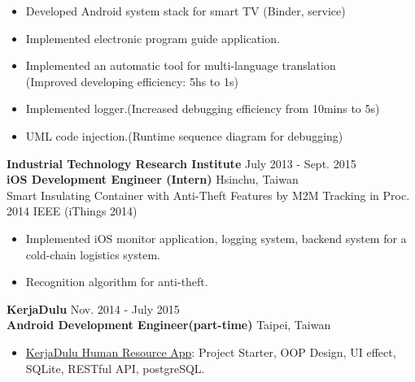 \documentclass{res}
\begin{document}
\begin{resume}
				\begin{itemize}[leftmargin=*]
					\item Developed Android system stack for smart TV (Binder, service)	
					\vspace{-0.05in}
					\item Implemented electronic program guide application.
					\vspace{-0.05in}
					\item Implemented an automatic tool for multi-language translation \\(Improved developing efficiency: 5hs to 1s)
					\vspace{-0.05in}		
					\item Implemented logger.(Increased debugging efficiency from 10mins to 5s)
					\vspace{-0.05in}	
					\item UML code injection.(Runtime sequence diagram for debugging)
				\end{itemize}
				\vspace{-0.12in}
				{\bf Industrial Technology Research Institute } {\hfill July 2013 - Sept. 2015}\\	
				{\bf iOS Development Engineer (Intern)}                        {\hfill Hsinchu, Taiwan}\\
				Smart Insulating Container with Anti-Theft Features by M2M Tracking {\footnotesize in Proc. 2014 IEEE (iThings 2014)}
				\vspace{0.05in}
				\begin{itemize}[leftmargin=*]


					\item Implemented iOS monitor application, logging system, backend system for a cold-chain logistics system.
					\vspace{-0.05in} 
					\item Recognition algorithm for anti-theft.
				\end{itemize}
				\vspace{-0.12in}

	 			{\bf KerjaDulu }                                {\hfill  Nov. 2014 - July 2015}\\
				{\bf Android Development Engineer(part-time)}			    	 {\hfill Taipei, Taiwan}
		
				\begin{itemize}[leftmargin=*]
					\item {\href{https://play.google.com/store/apps/details?id=com.kerjadulu.kerjadulu&hl=zh_TW}{KerjaDulu Human Resource App}}: Project Starter, OOP Design, UI effect, SQLite, RESTful API, postgreSQL.
				\end{itemize}
				\vspace{-0.12in}


\end{resume}
\end{document}

